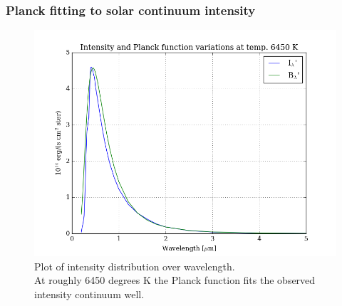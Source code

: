 \documentclass[11pt,a4paper,notitlepage]{article}
\begin{document}
\subsubsection{Planck fitting to solar continuum intensity}
\begin{figure}[H]
\center

	\includegraphics[scale=0.42]{../figs/2obs_planck.png}
	\caption{Plot of intensity distribution over wavelength.\\
	At roughly 6450 degrees K the Planck function fits the observed intensity continuum well.}
\end{figure}
\end{document}
